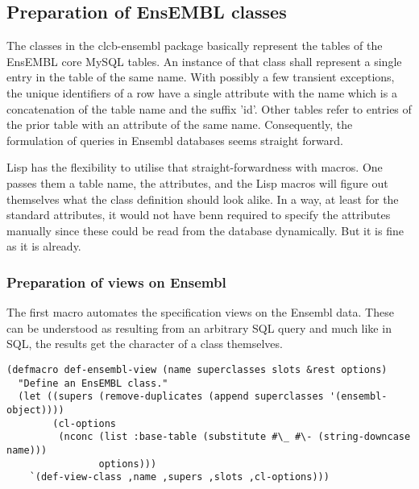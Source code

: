 \documentclass{book}
\newcommand\ensembl{EnsEMBL }
\begin{document}
\subsection{Preparation of \ensembl classes}

The classes in the clcb-ensembl package basically represent the tables of
the \ensembl core MySQL tables. An instance of that class shall represent 
a single entry in the table of the same name. With possibly a few transient
exceptions, the unique identifiers of a row have a single attribute with the 
name which is a concatenation of the table name and the suffix 'id'. Other
tables refer to entries of the prior table with an attribute of the same name.
Consequently, the formulation of queries in Ensembl databases seems straight
forward.

Lisp has the flexibility to utilise that straight-forwardness with
macros. One passes them a table name, the attributes, and the Lisp macros
will figure out themselves what the class definition should look alike.
In a way, at least for the standard attributes, it would not have benn required to
specify the attributes manually since these could be read from the database dynamically.
But it is fine as it is already.

\subsubsection{Preparation of views on Ensembl}

The first macro automates the specification views on the Ensembl data. These
can be understood as resulting from an arbitrary SQL query and much like in 
SQL, the results get the character of a class themselves.

\begin{lstlisting}
(defmacro def-ensembl-view (name superclasses slots &rest options)
  "Define an EnsEMBL class."
  (let ((supers (remove-duplicates (append superclasses '(ensembl-object))))
        (cl-options
         (nconc (list :base-table (substitute #\_ #\- (string-downcase name)))
                options)))
    `(def-view-class ,name ,supers ,slots ,cl-options)))
\end{lstlisting}
\end{document}
